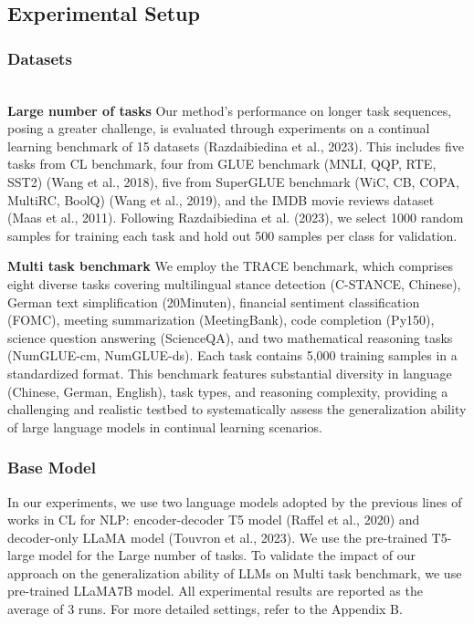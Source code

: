 \documentclass[letterpaper]{article} %
\begin{document}
\subsection{Experimental Setup}
\subsubsection{Datasets}
\\
\textbf{Large number of tasks}
Our method’s performance on longer task sequences, posing a greater challenge, is evaluated through experiments on a continual learning benchmark of 15 datasets (Razdaibiedina et al., 2023). This includes five tasks from CL benchmark, four from GLUE benchmark (MNLI, QQP, RTE, SST2) (Wang et al., 2018), five from SuperGLUE benchmark (WiC, CB, COPA, MultiRC, BoolQ) (Wang et al., 2019), and the IMDB movie reviews dataset (Maas et al., 2011). Following Razdaibiedina et al. (2023), we select 1000 random samples for training each task and hold out 500 samples per class for validation.



\textbf{Multi task benchmark}
We employ the TRACE benchmark, which comprises eight diverse tasks covering multilingual stance detection (C-STANCE, Chinese), German text simplification (20Minuten), financial sentiment classification (FOMC), meeting summarization (MeetingBank), code completion (Py150), science question answering (ScienceQA), and two mathematical reasoning tasks (NumGLUE-cm, NumGLUE-ds). Each task contains 5,000 training samples in a standardized format. This benchmark features substantial diversity in language (Chinese, German, English), task types, and reasoning complexity, providing a challenging and realistic testbed to systematically assess the generalization ability of large language models in continual learning scenarios.

\subsubsection{Base Model}
In our experiments, we use two language models adopted by the previous lines of works in CL for NLP: encoder-decoder T5 model (Raffel et al., 2020) and decoder-only LLaMA model (Touvron et al., 2023). We use the pre-trained T5-large model for the Large number of tasks. To validate the impact of our approach on the generalization ability of LLMs on Multi task benchmark, we use pre-trained LLaMA7B model. All experimental results are reported as the average of 3 runs. For more detailed settings, refer to the Appendix B.
\end{document}

